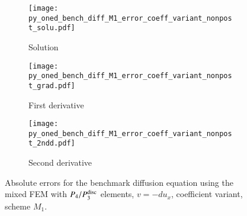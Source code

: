 \documentclass[review,3p]{elsarticle}
\begin{document}
\begin{figure}[!ht]
    \begin{subfigure}{5.5cm}
        \texttt{[image: py\_oned\_bench\_diff\_M1\_error\_coeff\_variant\_nonpost\_solu.pdf]}
        \caption{Solution}
        \label{py_oned_bench_diff_M1_error_coeff_variant_nonpost_solu}
    \end{subfigure}
    \hspace{-0.2cm}
    \begin{subfigure}{5.5cm}
        \texttt{[image: py\_oned\_bench\_diff\_M1\_error\_coeff\_variant\_nonpost\_grad.pdf]}
        \caption{First derivative}
        \label{py_oned_bench_diff_M1_error_coeff_variant_nonpost_grad}
    \end{subfigure}
    \hspace{-0.2cm}
    \begin{subfigure}{5.5cm}
        \texttt{[image: py\_oned\_bench\_diff\_M1\_error\_coeff\_variant\_nonpost\_2ndd.pdf]}
        \caption{Second derivative}
        \label{py_oned_bench_diff_M1_error_coeff_variant_nonpost_2ndd}
    \end{subfigure}
\caption{Absolute errors for the benchmark diffusion equation using the mixed FEM with $P_4/P_3^{\rm disc}$ elements, $v=-du_x$, coefficient variant, scheme $M_1$.}
\label{py_oned_bench_diff_M1_error_coeff_variant_nonpost}
\end{figure}



  
\end{document}
